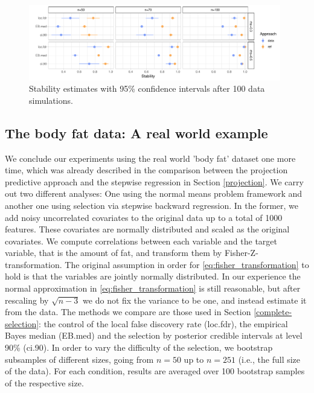 \documentclass[american,]{article}
\theoremstyle{definition}
\begin{document}
\begin{figure}[tp]
  \centering
  \includegraphics[width=0.98\textwidth]{graphics/stability.pdf}
  \caption{Stability estimates with 95\% confidence intervals after 100 data simulations.\\}
  \label{fig:stability}
\end{figure}




\hypertarget{real-world-data}{%
\subsection{The body fat data: A real world example}\label{real-world-data}}

We conclude our experiments using the real world 'body fat' dataset one more time, which was already described in the comparison between the projection predictive approach and the stepwise regression in Section \ref{projection}. We carry out two different analyses: One using the normal means problem framework and another one using selection via stepwise backward regression. In the former, we add noisy uncorrelated covariates to the original data up to a total of 1000 features. These covariates are normally distributed and scaled as the original covariates. We compute correlations between each variable and the target variable, that is the amount of fat, and transform them by Fisher-Z-transformation. The original assumption in order for \eqref{eq:fisher_transformation} to hold is that the variables are jointly normally distributed. In our experience the normal approximation in \eqref{eq:fisher_transformation} is still reasonable, but after rescaling by $\sqrt{n-3}$ we do not fix the variance to be one, and instead estimate it from the data. The methods we compare are those used in Section \ref{complete-selection}: the control of the local false discovery rate (loc.fdr), the empirical Bayes median (EB.med) and the selection by posterior credible intervals at level 90\% (ci.90). 
In order to vary the difficulty of the selection, we bootstrap subsamples of different sizes, going from $n=50$ up to $n=251$ (i.e., the full size of the data). For each condition, results are averaged over 100 bootstrap samples of the respective size.
\end{document}
